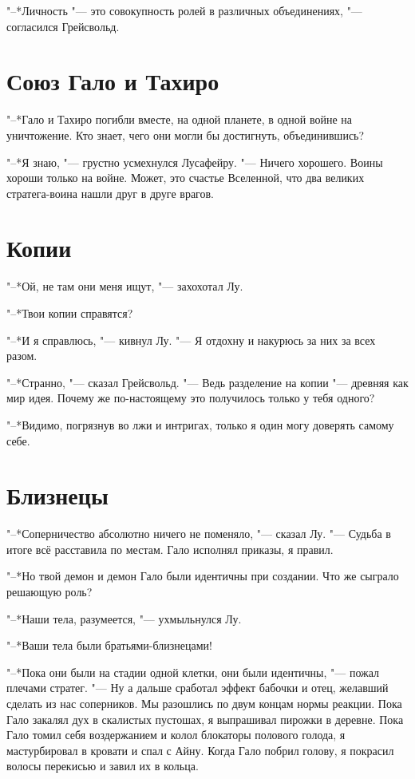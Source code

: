 \documentclass[a4paper,10pt,fleqn]{book}
\begin{document}
"--*Личность "--- это совокупность ролей в различных объединениях, "--- согласился Грейсвольд.

\section{Союз Гало и Тахиро}

"--*Гало и Тахиро погибли вместе, на одной планете, в одной войне на уничтожение.
Кто знает, чего они могли бы достигнуть, объединившись?

"--*Я знаю, "--- грустно усмехнулся Лусафейру.
"--- Ничего хорошего.
Воины хороши только на войне.
Может, это счастье Вселенной, что два великих стратега-воина нашли друг в друге врагов.

\section{Копии}

"--*Ой, не там они меня ищут, "--- захохотал Лу.

"--*Твои копии справятся?

"--*И я справлюсь, "--- кивнул Лу.
"--- Я отдохну и накурюсь за них за всех разом.

"--*Странно, "--- сказал Грейсвольд.
"--- Ведь разделение на копии "--- древняя как мир идея.
Почему же по-настоящему это получилось только у тебя одного?

"--*Видимо, погрязнув во лжи и интригах, только я один могу доверять самому себе.

\section{Близнецы}

"--*Соперничество абсолютно ничего не поменяло, "--- сказал Лу.
"--- Судьба в итоге всё расставила по местам.
Гало исполнял приказы, я правил.

"--*Но твой демон и демон Гало были идентичны при создании.
Что же сыграло решающую роль?

"--*Наши тела, разумеется, "--- ухмыльнулся Лу.

"--*Ваши тела были братьями-близнецами!

"--*Пока они были на стадии одной клетки, они были идентичны, "--- пожал плечами стратег.
"--- Ну а дальше сработал эффект бабочки и отец, желавший сделать из нас соперников.
Мы разошлись по двум концам нормы реакции.
Пока Гало закалял дух в скалистых пустошах, я выпрашивал пирожки в деревне.
Пока Гало томил себя воздержанием и колол блокаторы полового голода, я мастурбировал в кровати и спал с Айну.
Когда Гало побрил голову, я покрасил волосы перекисью и завил их в кольца.
\end{document}
